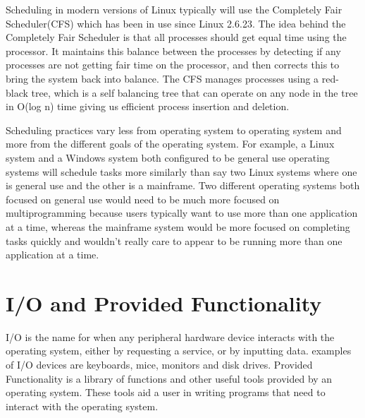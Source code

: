 \documentclass[10pt,serif,draftclsnofoot,onecolumn]{IEEEtran}
\begin{document}
	\newline
	\par
	Scheduling in modern versions of Linux typically will use the Completely Fair Scheduler(CFS) which has been in use since Linux 2.6.23\cite{6}. The idea behind the Completely Fair Scheduler is that all processes should get equal time using the processor. It maintains this balance between the processes by detecting if any processes are not getting fair time on the processor, and then corrects this to bring the system back into balance. The CFS manages processes using a red-black tree, which is a self balancing tree that can operate on any node in the tree in O(log n) time giving us efficient process insertion and deletion\cite{6}.
	\newline
	\par
	Scheduling practices vary less from operating system to operating system and more from the different goals of the operating system. For example, a Linux system and a Windows system both configured to be general use operating systems will schedule tasks more similarly than say two Linux systems where one is general use and the other is a mainframe. Two different operating systems both focused on general use would need to be much more focused on multiprogramming because users typically want to use more than one application at a time, whereas the mainframe system would be more focused on completing tasks quickly and wouldn't really care to appear to be running more than one application at a time.
	
\section{I/O and Provided Functionality}
	\par
	I/O is the name for when any peripheral hardware device interacts with the operating system, either by requesting a service, or by inputting data. examples of I/O devices are keyboards, mice, monitors and disk drives. Provided Functionality is a library of functions and other useful tools provided by an operating system. These tools aid a user in writing programs that need to interact with the operating system.
\end{document}
